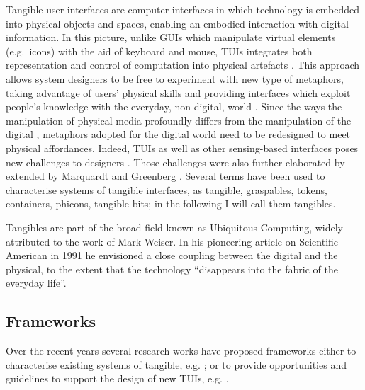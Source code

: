 Tangible user interfaces are computer interfaces in which technology is embedded into physical objects and spaces, enabling an embodied interaction with digital information. In this picture, unlike GUIs which manipulate virtual elements (e.g.~icons) with the aid of keyboard and mouse, TUIs integrates both representation and control of computation into physical artefacts \autocite{krumm2009ubiquitous}. This approach allows system designers to be free to experiment with new type of metaphors, taking advantage of users' physical skills and providing interfaces which exploit people's knowledge with the everyday, non-digital, world \autocite{Jacob:2008vm}. Since the ways the manipulation of physical media profoundly differs from the manipulation of the digital \autocite{Terrenghi:2007uv}, metaphors adopted for the digital world need to be redesigned to meet physical affordances. Indeed, TUIs as well as other sensing-based interfaces poses new challenges to designers \autocite{Bellotti:2002wg}. Those challenges were also further elaborated by extended by Marquardt and Greenberg \autocite*{Marquardt:2012tg}. Several terms have been used to characterise systems of tangible interfaces, as tangible, graspables, tokens, containers, phicons, tangible bits; in the following I will call them tangibles.

Tangibles are part of the broad field known as Ubiquitous Computing, widely attributed to the work of Mark Weiser. In his pioneering article on Scientific American in 1991 \autocite{weiser1991computer} he envisioned a close coupling between the digital and the physical, to the extent that the technology ``disappears into the fabric of the everyday life''.

\subsection{Frameworks}\label{frameworks}

Over the recent years several research works have proposed frameworks either to characterise existing systems of tangible, e.g. \autocites{Fishkin:2004uv}{Jacob:2008vm}{Hornecker:2006uq}; or to provide opportunities and guidelines to support the design of new TUIs, e.g. \autocites{Benford:2005bo}{Shaer:2004ta}{Rogers:2006te}.

